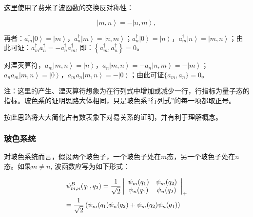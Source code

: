 这里使用了费米子波函数的交换反对称性：

\begin{equation}
\left| {m,n} \right\rangle  = - \left| {n,m} \right\rangle ,
\end{equation}


再者：$a_m^\dag  \left| 0 \right\rangle  = \left| m \right\rangle
$，$a_n^\dag  \left| m \right\rangle  = \left| {n,m} \right\rangle
$；$a_n^\dag  \left| 0 \right\rangle  = \left| n \right\rangle
$，$a_m^\dag  \left| n \right\rangle  = \left| {m,n} \right\rangle
$；由此可证：$a_m^\dag a_n^\dag   =  - a_n^\dag  a_m^\dag $,
即：$\left\{ a_m^\dag , a_n^\dag \right\} = 0$。

对湮灭算符，$a_m \left| {m,n} \right\rangle  = \left| n
\right\rangle $，$a_n \left| {m,n} \right\rangle  =  - a_n \left|
{n,m} \right\rangle  =  - \left| m \right\rangle $；$a_n a_m \left|
{m,n} \right\rangle  = \left| 0 \right\rangle $，$a_m a_n \left|
{m,n} \right\rangle  =  - \left| 0 \right\rangle $；由此可证$\{a_m,
a_n\} =
0$。


注：这里的产生、湮灭算符想象为在行列式中增加或减少一行，行指标为量子态的指标。玻色系的证明思路大体相同，只是玻色系“行列式”的每一项都取正号。

按此思路将大大简化占有数表象下对易关系的证明，并有利于理解概念。


\subsubsection{玻色系统}

对玻色系统而言，假设两个玻色子，一个玻色子处在$m$态，另一个玻色子处在$n$态。如果$m \ne n$, 波函数应写为如下形式：

\begin{equation}\label{two bosons wavefunction}
\begin{gathered}
\psi _{m,n}^B (q_1 ,q_2 ) = \frac{1} {{\sqrt 2 }}\left|
{\begin{array}{*{20}c}
   {\psi _m (q_1 )} & {\psi _m (q_2 )}  \\
   {\psi _n (q_1 )} & {\psi _n (q_2 )}  \\
\end{array} } \right|_+ \hfill \\
= \frac{1}{{\sqrt 2 }}\left( {\psi _m (q_1 )\psi _n (q_2 ) + \psi _m
(q_2 )\psi _n (q_1 )} \right) \hfill \\
\end{gathered}
\end{equation}


